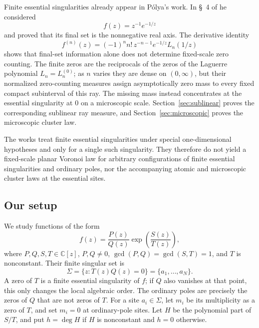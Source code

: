 \documentclass[reqno]{article}
\theoremstyle{definition}
\theoremstyle{remark}
\theoremstyle{plain}
\newcommand{\C}{\mathbb C}
\begin{document}
Finite essential singularities already appear in P\'olya's work. In \S~4 of \cite{Po2} he considered
\[
f(z)=z^{-1}e^{-1/z}
\]
and proved that its final set is the nonnegative real axis. The derivative identity
\[
f^{(n)}(z)=(-1)^n n!\,z^{-n-1}e^{-1/z}L_n(1/z)
\]
shows that final-set information alone does not determine fixed-scale zero counting. The finite zeros are the reciprocals of the zeros of the Laguerre polynomial $L_n=L_n^{(0)}$; as $n$ varies they are dense on $(0,\infty)$, but their normalized zero-counting measures assign asymptotically zero mass to every fixed compact subinterval of this ray. The missing mass instead concentrates at the essential singularity at $0$ on a microscopic scale. Section~\ref{sec:sublinear} proves the corresponding sublinear ray measure, and Section~\ref{sec:microscopic} proves the microscopic cluster law.

The works \cite{Ed,ClEd} treat finite essential singularities under special one-dimensional hypotheses and only for a single such singularity. They therefore do not yield a fixed-scale planar Voronoi law for arbitrary configurations of finite essential singularities and ordinary poles, nor the accompanying atomic and microscopic cluster laws at the essential sites.

\subsection{Our setup}
We study functions of the form
\begin{equation}\label{eq:mixed}
f(z)=\frac{P(z)}{Q(z)}\exp\!\left(\frac{S(z)}{T(z)}\right),
\end{equation}
where $P,Q,S,T\in\C[z]$, $P,Q\ne0$, $\gcd(P,Q)=\gcd(S,T)=1$, and $T$ is nonconstant. Their finite singular set is
\[
\Sigma=\{z:T(z)Q(z)=0\}=\{a_1,\ldots,a_N\}.
\]
A zero of \(T\) is a finite essential singularity of \(f\); if \(Q\) also vanishes at that point, this only changes the local algebraic order. The ordinary poles are precisely the zeros of \(Q\) that are not zeros of \(T\). For a site \(a_i\in\Sigma\), let \(m_i\) be its multiplicity as a zero of \(T\), and set \(m_i=0\) at ordinary-pole sites. Let $H$ be the polynomial part of $S/T$, and put $h=\deg H$ if $H$ is nonconstant and $h=0$ otherwise.
\end{document}
